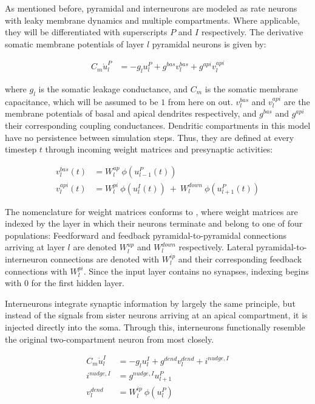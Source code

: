 As mentioned before, pyramidal and interneurons are modeled as rate neurons with leaky membrane dynamics and multiple
compartments. Where applicable, they will be differentiated with superscripts $P$ and $I$ respectively.  The derivative
somatic membrane potentials of layer $l$ pyramidal neurons is given by:

\begin{align}
  C_m \dot{u}_l^P & = - g_l u_l^{P} + g^{bas} v_l^{bas} + g^{api} v_l^{api} \label{eq-pyr-dynamics-rate}
\end{align}

where $g_l$ is the somatic leakage conductance, and $C_m$ is the somatic membrane capacitance, which will be assumed to
be $1$ from here on out. $v_l^{bas}$ and $v_l^{api}$ are the membrane potentials of basal and apical dendrites
respectively, and $g^{bas}$ and $g^{api}$ their corresponding coupling conductances.  Dendritic compartments in this
model have no persistence between simulation steps. Thus, they are defined at every timestep $t$ through incoming weight
matrices and presynaptic activities:

\begin{align}
  v_l^{bas}(t) & = W_l^{up} \ \phi(u_{l-1}^P(t)) \label{eq-v-bas-rate}                                     \\
  v_l^{api}(t) & =  W_l^{pi} \ \phi(u_l^I(t)) \ + \  W_l^{down} \ \phi(u_{l+1}^P(t)) \label{eq-v-api-rate}
\end{align}

The nomenclature for weight matrices conforms to \cite{Haider2021}, where weight matrices
are indexed by the layer in which their neurons terminate and belong to one of four populations: Feedforward and
feedback pyramidal-to-pyramidal connections arriving at layer $l$ are denoted $W_l^{up}$ and $W_l^{down}$ respectively.
Lateral pyramidal-to-interneuron connections are denoted with $W_l^{ip}$ and their corresponding feedback connections
with $W_l^{pi}$. Since the input layer contains no synapses, indexing begins with $0$ for the first hidden layer.
\newline

Interneurons integrate synaptic information by largely the same principle, but instead of the signals from
sister neurons arriving at an apical compartment, it is injected directly into the soma. Through this, interneurons
functionally resemble the original two-compartment neuron from \cite{urbanczik2014learning} most closely.

\begin{align}
  C_m \dot{u}_l^I & = - g_l u_l^{I} + g^{dend} v_l^{dend} + i^{nudge, I}\label{eq-intn-dynamics} \\
  i^{nudge, I}    & = g^{nudge, I} u_{l+1}^P                                                     \\
  v_l^{dend}      & = W_l^{ip} \ \phi(u_{l}^P)
\end{align}

